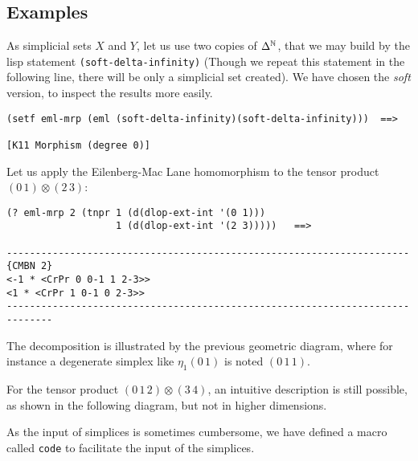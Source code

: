 \subsection* {Examples}
%
\vskip 0.40cm
\centerline{}
\vskip 0.40cm
%
As simplicial sets $X$ and $Y$, let us use two copies of $\Delta^{{\Bbb N}}$, that we may build
by the lisp statement {\tt (soft-delta-infinity)} (Though we repeat this statement
in the following line, there will be only a simplicial set created). We have chosen the {\em soft}
version, to inspect  the results more easily. 
{\footnotesize\begin{verbatim} 
(setf eml-mrp (eml (soft-delta-infinity)(soft-delta-infinity)))  ==>

[K11 Morphism (degree 0)]
\end{verbatim}}
Let us apply the Eilenberg-Mac Lane homomorphism to the tensor product
$(0\, 1)\otimes (2\, 3)$:
{\footnotesize\begin{verbatim} 
(? eml-mrp 2 (tnpr 1 (d(dlop-ext-int '(0 1)))
                   1 (d(dlop-ext-int '(2 3)))))   ==>

----------------------------------------------------------------------{CMBN 2}
<-1 * <CrPr 0 0-1 1 2-3>>
<1 * <CrPr 1 0-1 0 2-3>>
------------------------------------------------------------------------------
\end{verbatim}}
\newpage
The decomposition is illustrated by the previous geometric diagram, where for instance
a degenerate simplex like $\eta_1(0\, 1)$ is noted $(0\, 1\, 1)$.
\par
For the tensor product $(0\,1\,2)\otimes (3\,4)$, an intuitive description
is still possible, as shown in the following diagram, but not in higher dimensions.
\par
As the input of simplices is sometimes cumbersome, we have defined a macro called {\tt code}
to facilitate the input of the simplices.
